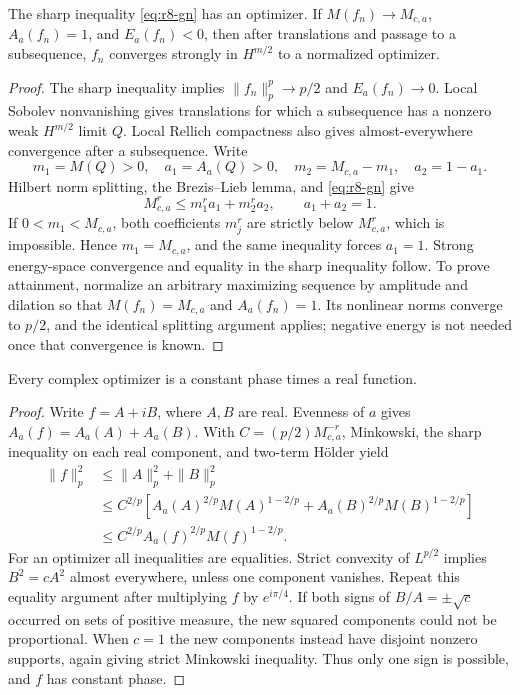 \begin{lemma}
\label{lem:r8-compactness}
The sharp inequality \eqref{eq:r8-gn} has an optimizer.
If $M(f_n)\to M_{c,a}$, $A_a(f_n)=1$, and $E_a(f_n)<0$,
then after translations and passage to a subsequence,
$f_n$ converges strongly in $H^{m/2}$ to a normalized optimizer.
\end{lemma}
\begin{proof}
The sharp inequality implies
$\|f_n\|_p^p\to p/2$ and $E_a(f_n)\to0$.
Local Sobolev nonvanishing gives translations for which a subsequence
has a nonzero weak $H^{m/2}$ limit $Q$. Local Rellich compactness
also gives almost-everywhere convergence after a subsequence.
Write
\[
 m_1=M(Q)>0,\quad a_1=A_a(Q)>0,\quad
 m_2=M_{c,a}-m_1,\quad a_2=1-a_1.
\]
Hilbert norm splitting, the Brezis--Lieb lemma, and
\eqref{eq:r8-gn} give
\[
 M_{c,a}^r\le m_1^ra_1+m_2^ra_2,\qquad a_1+a_2=1.
\]
If $0<m_1<M_{c,a}$, both coefficients $m_j^r$ are strictly below
$M_{c,a}^r$, which is impossible. Hence $m_1=M_{c,a}$, and the
same inequality forces $a_1=1$. Strong energy-space convergence
and equality in the sharp inequality follow.
To prove attainment, normalize an arbitrary maximizing sequence
by amplitude and dilation so that $M(f_n)=M_{c,a}$ and
$A_a(f_n)=1$. Its nonlinear norms converge to $p/2$, and the
identical splitting argument applies; negative energy is not
needed once that convergence is known.
\end{proof}

\begin{lemma}\label{lem:r8-constant-phase}
Every complex optimizer is a constant phase times a real function.
\end{lemma}
\begin{proof}
Write $f=A+iB$, where $A,B$ are real. Evenness of $a$ gives
$A_a(f)=A_a(A)+A_a(B)$. With
$C=(p/2)M_{c,a}^{-r}$, Minkowski, the sharp inequality on each real
component, and two-term H\"older yield
\begin{align*}
 \|f\|_p^2
 &\le\|A\|_p^2+\|B\|_p^2\\
 &\le C^{2/p}\left[
 A_a(A)^{2/p}M(A)^{1-2/p}
 +A_a(B)^{2/p}M(B)^{1-2/p}\right]\\
 &\le C^{2/p}A_a(f)^{2/p}M(f)^{1-2/p}.
\end{align*}
For an optimizer all inequalities are equalities. Strict convexity
of $L^{p/2}$ implies $B^2=cA^2$ almost everywhere, unless one
component vanishes. Repeat this equality argument after multiplying
$f$ by $e^{i\pi/4}$. If both signs of $B/A=\pm\sqrt c$ occurred
on sets of positive measure, the new squared components could
not be proportional. When $c=1$ the new components instead have
disjoint nonzero supports, again giving strict Minkowski inequality.
Thus only one sign is possible, and $f$ has constant phase.
\end{proof}

